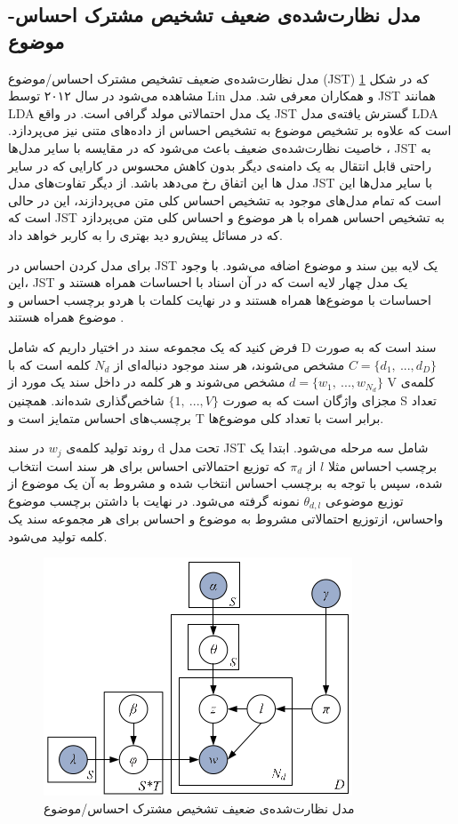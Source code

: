 	\subsection{مدل نظارت‌شده‌ی ضعیف تشخیص مشترک احساس-موضوع}
	\label{chap3sec4sub1}
مدل نظارت‌شده‌ی ضعیف تشخیص مشترک احساس/موضوع
(JST) \cite{lin2012weakly}
 که در شکل 
\ref{chap3-fig8}
مشاهده می‌‌شود در سال ۲۰۱۲ توسط
 Lin
 و همکاران معرفی‌ شد. مدل
 JST
  همانند 
 LDA
 یک مدل احتمالاتی مولد گرافی است. در واقع
 JST
 گسترش یافته‌ی‌ مدل 
 LDA
 است که علاوه بر تشخیص موضوع به تشخیص احساس از داده‌های متنی نیز می‌پردازد.  خاصیت نظارت‌شده‌ی ضعیف باعث می‌‌شود که در مقایسه با سایر مدل‌ها
 ، JST
  به راحتی‌ قابل انتقال به یک دامنه‌ی دیگر بدون کاهش محسوس در کارایی که در سایر مدل ها این اتفاق رخ می‌‌دهد باشد. از دیگر تفاوت‌های مدل
   JST
    با سایر مدل‌ها این است که تمام مدل‌های موجود به تشخیص احساس کلی‌ متن می‌پردازند، این در حالی‌ است که
     JST
      به تشخیص احساس همراه با هر موضوع و احساس کلی‌ متن می‌‌پردازد که در مسائل پیش‌رو دید بهتری را به کاربر خواهد داد.
 
  برای مدل کردن احساس در 
 JST
 یک لایه بین سند و موضوع اضافه می‌شود. با وجود این، 
 JST
 یک مدل چهار لایه است که در آن اسناد با احساسات همراه هستند و احساسات با موضوع‌ها همراه هستند و در نهایت کلمات با هردو برچسب احساس و موضوع همراه هستند
 \cite{lin2012weakly}.
 
  فرض کنید که یک مجموعه سند در اختیار داریم که شامل
  D
   سند است که به صورت  
  $C = \{d_1,\ ...,d_D\}$
   مشخص می‌‌شوند، هر سند موجود دنباله‌ای از  
  $N_d$
   کلمه است که با  
   $d=\{w_1,\ ...,w_{N_d} \}$
    مشخص می‌‌شوند و هر کلمه در داخل سند یک مورد از 
    V
    کلمه‌ی مجزای واژگان است که به صورت 
    $\{1,\ ...,V\}$
    شاخص‌گذاری شده‌اند. همچنین 
    S
    تعداد برچسب‌های احساس متمایز است و 
    T
    برابر است با تعداد کلی‌ موضوع‌ها.
    
     روند تولید کلمه‌ی  
   $w_j$
    در سند 
    d
    تحت مدل 
    JST
    شامل سه‌ مرحله می‌‌شود. ابتدا یک برچسب احساس مثلا  
    $l$
    از  
    $\pi_d$
    که توزیع احتمالاتی احساس برای هر سند است انتخاب شده، سپس با توجه به برچسب احساس انتخاب شده و مشروط به آن یک موضوع از توزیع موضوعی 
    $\theta_{d,l}$
     نمونه گرفته می‌شود. در نهایت با داشتن برچسب موضوع واحساس، ازتوزیع احتمالاتی مشروط به موضوع و احساس برای هر مجموعه سند یک کلمه تولید می‌شود. 
   	\begin{figure}[!h]
   		\centering
   		\includegraphics[scale=0.5]{chap3-img/JST}
   		\caption{مدل نظارت‌شده‌ی ضعیف تشخیص مشترک احساس/موضوع \cite{lin2012weakly}}
   		\label{chap3-fig8}
   	\end{figure}
    
